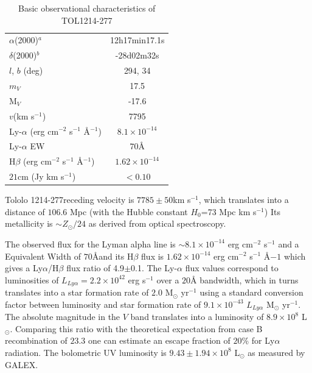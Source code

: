 \documentclass[a4paper, usenatbib, 12pt]{article}
\newcommand{\tol}{Tololo 1214-277}
\begin{document}
{\begin{table}
\begin{center}
\begin{tabular}{lc}
$\alpha$(2000)$^{a}$ & 12h17min17.1s\\
$\delta$(2000)$^{b}$ & -28d02m32s\\
$l$, $b$ (deg) & 294, 34\\
$m_V$ & 17.5\\
  M$_V$ & -17.6\\ 
$v$(km s$^{-1}$) & 7795\\
Ly-$\alpha$ (erg cm$^{-2}$ s$^{-1}$ \AA$^{-1}$)& $8.1\times 10^{-14}$ \\
Ly-$\alpha$ EW & $70$\AA\\
H$\beta$ (erg cm$^{-2}$ s$^{-1}$ \AA$^{-1}$) & $1.62\times 10^{-14}$ \\
$21$cm (Jy km s$^{-1}$)& $<0.10$ \\
\end{tabular}
\end{center}
\caption{Basic observational characteristics of TOL1214-277
  \cite{Thuan97}\\} 
\end{table}


\tol receding velocity is $7785\pm 50$km s$^{-1}$, which translates
into a distance of $106.6$ Mpc (with the Hubble constant $H_{0}$=73
Mpc km s$^{-1}$) 
Its metallicity is $\sim Z_{\odot}/24$ \cite{Izotov04} as derived from optical
spectroscopy. 


The observed flux for the Lyman alpha line is $\sim
8.1\times 10^{-14}$ erg cm$^{-2}$ s$^{-1}$ \cite{Thuan97}
and a Equivalent Width of $70$\AA and its H$\beta$ flux is 
$1.62\times 10^{-14}$ erg cm$^{-2}$ s$^{-1}$ \AA${-1}$
\cite{Izotov04} which gives a Ly$\alpha$/H$\beta$ flux ratio of
4.9$\pm$0.1. The Ly-$\alpha$ flux values correspond to luminosities of
$L_{Ly\alpha}=2.2\times 10^{42}$ erg s$^{-1}$ over a $20$\AA
bandwidth, which in turns translates  into a star formation rate of
$2.0$ M$_{\odot}$ yr$^{-1}$ using a standard conversion factor between
luminosity and star formation rate of $9.1\times 10^{-43}$
$L_{Ly\alpha}$ M$_{\odot}$ yr$^{-1}$. 
The absolute magnitude in the $V$ band translates into a luminosity of
$8.9\times 10^{8}$ L$_{\odot}$.
Comparing this ratio with the theoretical expectation from case B
recombination of $23.3$ \cite{Hummer1987} one can estimate an escape
fraction of $20$\% for Ly$\alpha$ radiation.
The bolometric UV luminosity is $9.43\pm1.94 \times 10^{8}$
L$_{\odot}$ as measured by GALEX. 

}
\end{document}
